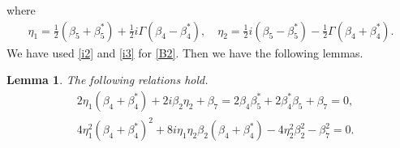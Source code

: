 \documentclass[10pt,leqno]{amsart}
\newtheorem{lem}[theorem]{Lemma}
\numberwithin{equation}{section}
\begin{document}
where
\begin{align}\label{50-2}
\eta_{1}=\frac{1}{2}\left(\beta_{5}+\beta_{5}^{*}\right)+\frac{1}{2}i\Gamma\left(\beta_{4}-\beta_{4}^{*}\right),\quad \eta_{2}=\frac{1}{2}i\left(\beta_{5}-\beta_{5}^{*}\right)-\frac{1}{2}\Gamma\left(\beta_{4}+\beta_{4}^{*}\right).
\end{align}
We have used \eqref{i2} and \eqref{i3} for \eqref{B2}.
Then we have the following lemmas.
\begin{lem}\label{prop:PhDKalbi3}
The following relations hold.
\begin{align}
&2\eta_{1}\left(\beta_{4}+\beta_{4}^{*}\right)+2i\beta_{2}\eta_{2}+\beta_{7}=2\beta_{4}\beta_{5}^{*}+2\beta_{4}^{*}\beta_{5}+\beta_{7}=0,\label{82}\\
&4\eta_{1}^{2}\left(\beta_{4}+\beta_{4}^{*}\right)^{2}+8i\eta_{1}\eta_{2}\beta_{2}\left(\beta_{4}+\beta_{4}^{*}\right)-4\eta_{2}^{2}\beta_{2}^{2}-\beta_{7}^{2}=0.\label{con4}
\end{align}
\end{lem}
\end{document}
